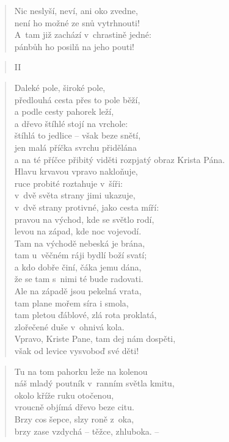\begin{verse}
Nic neslyší, neví, ani oko zvedne, \\
není ho možné ze snů vytrhnouti! \\
A~tam již zachází v~chrastině jedné: \\
pánbůh ho posilň na jeho pouti!
\end{verse}

\begin{verse}
II
\end{verse}

\begin{verse}
Daleké pole, široké pole, \\
předlouhá cesta přes to pole běží, \\
a podle cesty pahorek leží, \\
a dřevo štíhlé stojí na vrchole: \\
štíhlá to jedlice -- však beze snětí, \\
jen malá příčka svrchu přidělána \\
a na té příčce přibitý viděti rozpjatý obraz Krista Pána. \\
Hlavu krvavou vpravo nakloňuje, \\
ruce probité roztahuje v~šíři: \\
v~dvě světa strany jimi ukazuje, \\
v~dvě strany protivné, jako cesta míří: \\
pravou na východ, kde se světlo rodí, \\
levou na západ, kde noc vojevodí. \\
Tam na východě nebeská je brána, \\
tam u~věčném ráji bydlí boží svatí; \\
a kdo dobře činí, čáka jemu dána, \\
že se tam s~nimi té bude radovati. \\
Ale na západě jsou pekelná vrata, \\
tam plane mořem síra i smola, \\
tam pletou ďáblové, zlá rota proklatá, \\
zlořečené duše v~ohnivá kola. \\
Vpravo, Kriste Pane, tam dej nám dospěti, \\
však od levice vysvoboď své děti!
\end{verse}

\begin{verse}
Tu na tom pahorku leže na kolenou \\
náš mladý poutník v~ranním světla kmitu, \\
okolo kříže ruku otočenou, \\
vroucně objímá dřevo beze citu. \\
Brzy cos šepce, slzy roně z~oka, \\
brzy zase vzdychá -- těžce, zhluboka. --
\end{verse}

